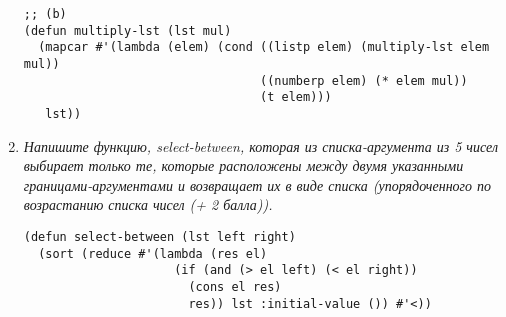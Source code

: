 \begin{enumerate}[wide=0pt]
\begin{lstlisting}
;; (b)
(defun multiply-lst (lst mul)
  (mapcar #'(lambda (elem) (cond ((listp elem) (multiply-lst elem mul))
                                 ((numberp elem) (* elem mul))
                                 (t elem)))
   lst))
\end{lstlisting}
\item \textit{Напишите функцию, select-between, которая из списка-аргумента из 5 чисел выбирает только те, которые расположены между двумя указанными границами-аргументами и возвращает их в виде списка (упорядоченного по возрастанию списка чисел (+ 2 балла)).}
\begin{lstlisting}
(defun select-between (lst left right)
  (sort (reduce #'(lambda (res el) 
                     (if (and (> el left) (< el right))
                       (cons el res)
                       res)) lst :initial-value ()) #'<))
\end{lstlisting}
\end{enumerate}